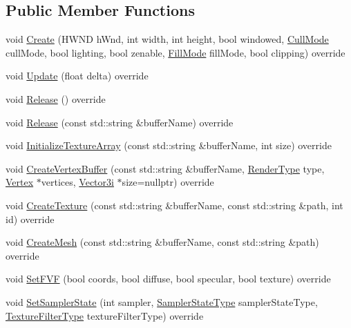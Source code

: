 \subsection*{Public Member Functions}
\begin{DoxyCompactItemize}
\item 
void \mbox{\hyperlink{classse_1_1_direct3_d_a0174f6e1436fa4171380cc603ca262f0}{Create}} (H\+W\+ND h\+Wnd, int width, int height, bool windowed, \mbox{\hyperlink{namespacese_a2447de8e300e86ac4a8893e0486fc3bb}{Cull\+Mode}} cull\+Mode, bool lighting, bool zenable, \mbox{\hyperlink{namespacese_a7ab38efb91dff288cc8279bedd6bc02c}{Fill\+Mode}} fill\+Mode, bool clipping) override
\item 
void \mbox{\hyperlink{classse_1_1_direct3_d_a39934c194406f108a992d82a4d265381}{Update}} (float delta) override
\item 
void \mbox{\hyperlink{classse_1_1_direct3_d_ae2979f16a5c35773cf2c243d8e6f90e4}{Release}} () override
\item 
void \mbox{\hyperlink{classse_1_1_direct3_d_a77f814cda45f2b490e11c522f8e752e3}{Release}} (const std\+::string \&buffer\+Name) override
\item 
void \mbox{\hyperlink{classse_1_1_direct3_d_a7d5db09c1cf0c5c45f61c631b174fcf2}{Initialize\+Texture\+Array}} (const std\+::string \&buffer\+Name, int size) override
\item 
void \mbox{\hyperlink{classse_1_1_direct3_d_a52e0bbf13e8045dab39bb2ef34028a94}{Create\+Vertex\+Buffer}} (const std\+::string \&buffer\+Name, \mbox{\hyperlink{namespacese_a9ed62241331cac830c5c1ba8450afc2b}{Render\+Type}} type, \mbox{\hyperlink{structse_1_1_vertex}{Vertex}} $\ast$vertices, \mbox{\hyperlink{namespacese_ada11715de7cf6e87b5dfb4611fe68d29}{Vector3i}} $\ast$size=nullptr) override
\item 
void \mbox{\hyperlink{classse_1_1_direct3_d_a33c350a77a959847d3571e14feb72c85}{Create\+Texture}} (const std\+::string \&buffer\+Name, const std\+::string \&path, int id) override
\item 
void \mbox{\hyperlink{classse_1_1_direct3_d_aab3d1a8b4ee8812dea07f5ecda5efc42}{Create\+Mesh}} (const std\+::string \&buffer\+Name, const std\+::string \&path) override
\item 
void \mbox{\hyperlink{classse_1_1_direct3_d_a1bf0217e47f4fb360f427517f86c75cd}{Set\+F\+VF}} (bool coords, bool diffuse, bool specular, bool texture) override
\item 
void \mbox{\hyperlink{classse_1_1_direct3_d_a494107956c2dceda015cbef73cdb36c1}{Set\+Sampler\+State}} (int sampler, \mbox{\hyperlink{namespacese_acff8e236c539422281bbc908758e0fb7}{Sampler\+State\+Type}} sampler\+State\+Type, \mbox{\hyperlink{namespacese_a13bef3f1227abf2f6bc06b97a4ea6cdf}{Texture\+Filter\+Type}} texture\+Filter\+Type) override

\end{DoxyCompactItemize}
